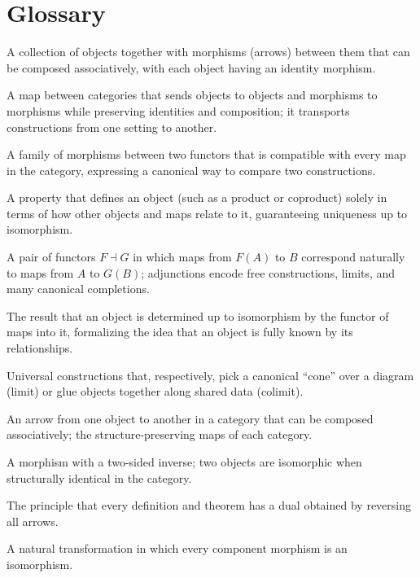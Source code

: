 \section*{Glossary}
\begin{description}[leftmargin=*,style=nextline,itemsep=0.3em]

\item[\textbf{Category.}] A collection of objects together with morphisms (arrows) between them that can be composed associatively, with each object having an identity morphism.

\item[\textbf{Functor.}] A map between categories that sends objects to objects and morphisms to morphisms while preserving identities and composition; it transports constructions from one setting to another.

\item[\textbf{Natural transformation.}] A family of morphisms between two functors that is compatible with every map in the category, expressing a canonical way to compare two constructions.

\item[\textbf{Universal property.}] A property that defines an object (such as a product or coproduct) solely in terms of how other objects and maps relate to it, guaranteeing uniqueness up to isomorphism.

\item[\textbf{Adjoint functors.}] A pair of functors $F\dashv G$ in which maps from $F(A)$ to $B$ correspond naturally to maps from $A$ to $G(B)$; adjunctions encode free constructions, limits, and many canonical completions.

\item[\textbf{Yoneda lemma.}] The result that an object is determined up to isomorphism by the functor of maps into it, formalizing the idea that an object is fully known by its relationships.

\item[\textbf{Limit and colimit.}] Universal constructions that, respectively, pick a canonical ``cone'' over a diagram (limit) or glue objects together along shared data (colimit).

\item[\textbf{Morphism.}] An arrow from one object to another in a category that can be composed associatively; the structure-preserving maps of each category.

\item[\textbf{Isomorphism.}] A morphism with a two-sided inverse; two objects are isomorphic when structurally identical in the category.

\item[\textbf{Duality.}] The principle that every definition and theorem has a dual obtained by reversing all arrows.

\item[\textbf{Natural isomorphism.}] A natural transformation in which every component morphism is an isomorphism.

\end{description}

